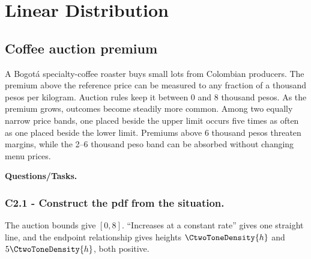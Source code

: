 \section{Linear Distribution}\label{sec:c2-linear-practice}

\subsection{Coffee auction premium}\label{sec:c2-linear-coffee}
A Bogotá specialty-coffee roaster buys small lots from Colombian producers.
The premium above the reference price can be measured to any fraction of a
thousand pesos per kilogram.  Auction rules keep it between 0 and 8 thousand
pesos.  As the premium grows, outcomes become steadily more common.  Among two
equally narrow price bands, one placed beside the upper limit occurs five times
as often as one placed beside the lower limit.  Premiums above 6 thousand pesos
threaten margins, while the 2--6 thousand peso band can be absorbed without
changing menu prices.

\begingroup{}
\endgroup

\textbf{Questions/Tasks.}
\begin{enumerate}
\end{enumerate}

\subsubsection*{C2.1 - Construct the pdf from the situation.}
\label{subsec:c2-linear-coffee-a}
The auction bounds give  $[0,8]$.  ``Increases at a constant rate''
gives one straight line, and the endpoint relationship gives heights $\CtwoToneDensity{h}$ and
$5\CtwoToneDensity{h}$, both positive.

